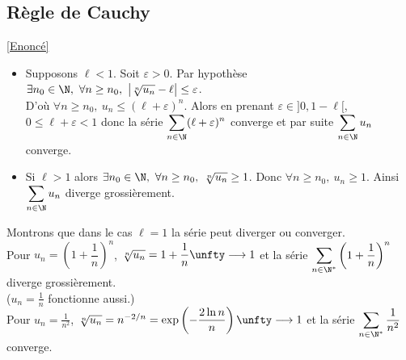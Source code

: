 \documentclass{book}
\begin{document}
	\subsection{Règle de Cauchy }
	\label{sec:regle-de-cauchy}
	\textcolor{blue}{\hyperref[Règle de Cauchy]{[Enoncé]}}\\
	\begin{itemize}
		\item Supposons $\ell<1$. Soit $\varepsilon>0$. Par hypothèse $\exists n_0\in \N,\ \forall n\geq n_0,\ \left|\sqrt[n]{u_n}-\ell\right|\leq \varepsilon$.\\
		D'où $\forall n\geq n_0,\ u_n\leq (\ell+\varepsilon)^n$. Alors en prenant $\varepsilon\in ]0,1-\ell[$, $0\leq\ell+\varepsilon<1$ donc la série $\displaystyle\sum_{n\in \N}(\ell+\varepsilon)^n$ converge et par suite $\displaystyle\sum_{n\in \N}u_n$ converge.
		\item Si $\ell>1$ alors $\exists n_0\in \N,\ \forall n\geq n_0,\ \sqrt[n]{u_n}\geq 1$. Donc $\forall n\geq n_0,\ u_n\geq 1$. Ainsi $\displaystyle\sum_{n\in \N}u_n$ diverge grossièrement.
	\end{itemize}
	Montrons que dans le cas $\ell=1$ la série peut diverger ou converger.\\
	Pour $u_n=\left(1+\dfrac{1}{n}\right)^n$, $\sqrt[n]{u_n}=1+\dfrac{1}{n}\unfty\longrightarrow 1$ et la série $\displaystyle\sum_{n\in \N^*}\left(1+\frac{1}{n}\right)^n$ diverge grossièrement.\\
	($u_n=\displaystyle\frac{1}{n}$ fonctionne aussi.)\\
	Pour $u_n=\displaystyle\frac{1}{n^2}$, $\sqrt[n]{u_n}=n^{-2/n}=\exp\left(-\dfrac{2\ln n}{n}\right)\unfty\longrightarrow 1$ et la série $\displaystyle\sum_{n\in \N^*}\frac{1}{n^2}$ converge.
	
\end{document}

